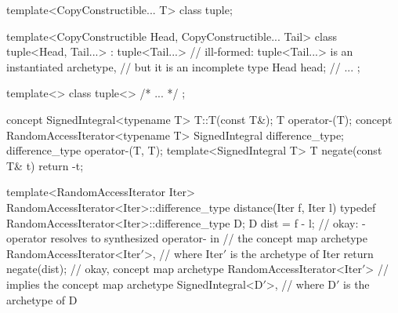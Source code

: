 \documentclass[american]{book}
\begin{document}
\begin{paras}
\pnum
{}
\begin{codeblock}
template<CopyConstructible... T> class tuple;

template<CopyConstructible Head, CopyConstructible... Tail>
class tuple<Head, Tail...> : tuple<Tail...> // ill-formed: tuple<Tail...> is an instantiated archetype, 
                                            // but it is an incomplete type
{
  Head head;
  // ...
};

template<> class tuple<> { /* ... */ };

\end{codeblock}
\addedConcepts{\mbox{\exitexample\exitnote}}

\pnum
{}
%
\addedConcepts{\mbox{\enterexample}}
\begin{codeblock}
concept SignedIntegral<typename T> {
  T::T(const T&);
  T operator-(T);
}
concept RandomAccessIterator<typename T> {
  SignedIntegral difference_type;
  difference_type operator-(T, T);
}
template<SignedIntegral T> T negate(const T& t) { return -t; }

template<RandomAccessIterator Iter>
RandomAccessIterator<Iter>::difference_type distance(Iter f, Iter l) {
  typedef RandomAccessIterator<Iter>::difference_type D;
  D dist = f - l;  // okay: - operator resolves to synthesized operator- in
                  // the concept map archetype RandomAccessIterator<Iter$'$>,  
                  // where Iter$'$ is the archetype of Iter
  return negate(dist); // okay, concept map archetype RandomAccessIterator<Iter$'$>
                       // implies the concept map archetype SignedIntegral<D$'$>,
                       // where D$'$ is the archetype of D}
\end{codeblock}
\addedConcepts{\mbox{\exitexample}}


\end{paras}
\end{document}

